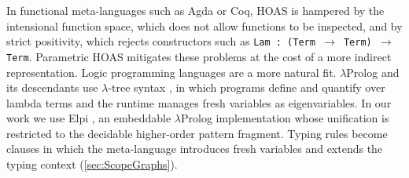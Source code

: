 In functional meta-languages such as Agda or Coq, HOAS is hampered by the
intensional function space, which does not allow functions to be inspected, and
by strict positivity, which rejects constructors such as
\texttt{Lam : (Term $\rightarrow$ Term) $\rightarrow$ Term}. Parametric HOAS
\autocite{PHOAS} mitigates these problems at the cost of a more indirect
representation. Logic programming languages are a more natural fit.
$\lambda$Prolog and its descendants use $\lambda$-tree syntax
\autocite{lambda-tree}, in which programs define and quantify over lambda terms
and the runtime manages fresh variables as eigenvariables. In our work we use Elpi
\autocite{dunchev_elpi_2015}, an embeddable $\lambda$Prolog implementation
whose unification is restricted to the decidable higher-order pattern fragment.
Typing rules become clauses in which the meta-language introduces fresh
variables and extends the typing context (\cref{sec:ScopeGraphs}).

